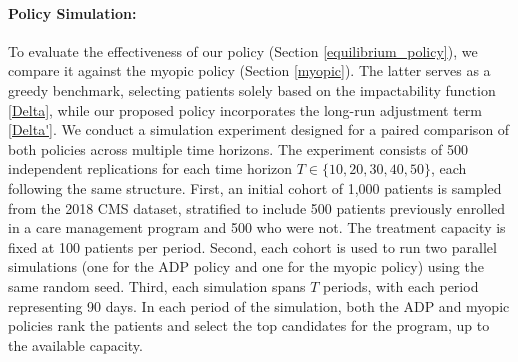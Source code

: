 \documentclass[12pt,a4paper]{article}
\newcommand{\bx}{\mathbf{x}}
\begin{document}

\paragraph{\bf Policy Simulation:}
To evaluate the effectiveness of our policy (Section \ref{equilibrium_policy}), we compare it against the myopic policy (Section \ref{myopic}). The latter serves as a greedy benchmark, selecting patients solely based on the impactability function \eqref{Delta}, while our proposed policy incorporates the long-run adjustment term \eqref{Delta'}. We conduct a simulation experiment designed for a paired comparison of both policies across multiple time horizons. The experiment consists of 500 independent replications for each time horizon $T \in \{10, 20, 30, 40, 50\}$, each following the same structure. First, an initial cohort of 1,000 patients is sampled from the 2018 CMS dataset, stratified to include 500 patients previously enrolled in a care management program and 500 who were not. The treatment capacity is fixed at 100 patients per period. Second, each cohort is used to run two parallel simulations (one for the ADP policy and one for the myopic policy) using the same random seed. Third, each simulation spans $T$ periods, with each period representing 90 days. In each period of the simulation, both the ADP and myopic policies rank the patients and select the top candidates for the program, up to the available capacity.
\end{document}
